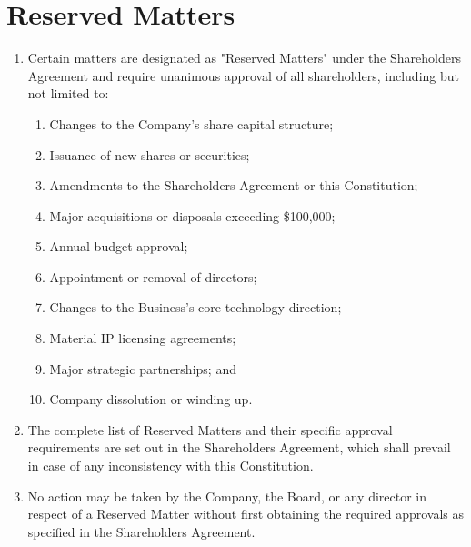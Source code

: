 \section{Reserved Matters}

\begin{enumerate}[label=(\alph*)]
    \item Certain matters are designated as "Reserved Matters" under the Shareholders Agreement and require unanimous approval of all shareholders, including but not limited to:
    \begin{enumerate}[label=(\roman*)]
        \item Changes to the Company's share capital structure;
        \item Issuance of new shares or securities;
        \item Amendments to the Shareholders Agreement or this Constitution;
        \item Major acquisitions or disposals exceeding \$100,000;
        \item Annual budget approval;
        \item Appointment or removal of directors;
        \item Changes to the Business's core technology direction;
        \item Material IP licensing agreements;
        \item Major strategic partnerships; and
        \item Company dissolution or winding up.
    \end{enumerate}
    
    \item The complete list of Reserved Matters and their specific approval requirements are set out in the Shareholders Agreement, which shall prevail in case of any inconsistency with this Constitution.
    
    \item No action may be taken by the Company, the Board, or any director in respect of a Reserved Matter without first obtaining the required approvals as specified in the Shareholders Agreement.
\end{enumerate} 